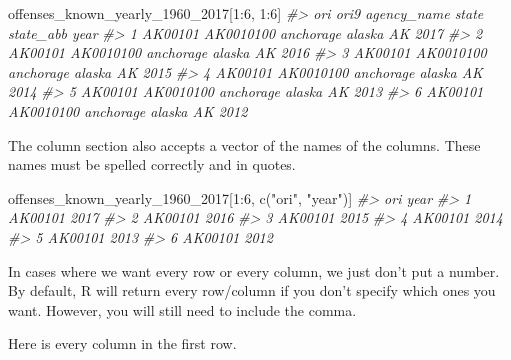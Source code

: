 \documentclass[
  12pt,
]{book}
\newenvironment{Shaded}{\begin{snugshade}}{\end{snugshade}}
\newcommand{\CommentTok}[1]{\textcolor[rgb]{0.37,0.37,0.37}{\textit{#1}}}
\newcommand{\DecValTok}[1]{\textcolor[rgb]{0.06,0.06,0.06}{#1}}
\newcommand{\FunctionTok}[1]{\textcolor[rgb]{0,0,0}{#1}}
\newcommand{\NormalTok}[1]{#1}
\newcommand{\SpecialCharTok}[1]{\textcolor[rgb]{0,0,0}{#1}}
\newcommand{\StringTok}[1]{\textcolor[rgb]{0.5,0.5,0.5}{#1}}
\begin{document}
\begin{Shaded}
\begin{Highlighting}[]
\NormalTok{offenses\_known\_yearly\_1960\_2017[}\DecValTok{1}\SpecialCharTok{:}\DecValTok{6}\NormalTok{, }\DecValTok{1}\SpecialCharTok{:}\DecValTok{6}\NormalTok{]}
\CommentTok{\#\textgreater{}       ori      ori9 agency\_name  state state\_abb year}
\CommentTok{\#\textgreater{} 1 AK00101 AK0010100   anchorage alaska        AK 2017}
\CommentTok{\#\textgreater{} 2 AK00101 AK0010100   anchorage alaska        AK 2016}
\CommentTok{\#\textgreater{} 3 AK00101 AK0010100   anchorage alaska        AK 2015}
\CommentTok{\#\textgreater{} 4 AK00101 AK0010100   anchorage alaska        AK 2014}
\CommentTok{\#\textgreater{} 5 AK00101 AK0010100   anchorage alaska        AK 2013}
\CommentTok{\#\textgreater{} 6 AK00101 AK0010100   anchorage alaska        AK 2012}
\end{Highlighting}
\end{Shaded}

The column section also accepts a vector of the names of the columns. These names must be spelled correctly and in quotes.

\begin{Shaded}
\begin{Highlighting}[]
\NormalTok{offenses\_known\_yearly\_1960\_2017[}\DecValTok{1}\SpecialCharTok{:}\DecValTok{6}\NormalTok{, }\FunctionTok{c}\NormalTok{(}\StringTok{"ori"}\NormalTok{, }\StringTok{"year"}\NormalTok{)]}
\CommentTok{\#\textgreater{}       ori year}
\CommentTok{\#\textgreater{} 1 AK00101 2017}
\CommentTok{\#\textgreater{} 2 AK00101 2016}
\CommentTok{\#\textgreater{} 3 AK00101 2015}
\CommentTok{\#\textgreater{} 4 AK00101 2014}
\CommentTok{\#\textgreater{} 5 AK00101 2013}
\CommentTok{\#\textgreater{} 6 AK00101 2012}
\end{Highlighting}
\end{Shaded}

In cases where we want every row or every column, we just don't put a number. By default, R will return every row/column if you don't specify which ones you want. However, you will still need to include the comma.

Here is every column in the first row.
\end{document}
